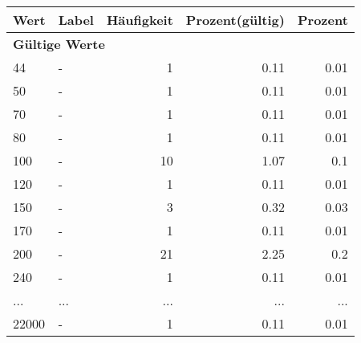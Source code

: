      \begin{longtable}{lXrrr}
     \toprule
     \textbf{Wert} & \textbf{Label} & \textbf{Häufigkeit} & \textbf{Prozent(gültig)} & \textbf{Prozent} \\
     \endhead
     \midrule
     \multicolumn{5}{l}{\textbf{Gültige Werte}}\\
        44 & \multicolumn{1}{X}{-} & %
          \num{1} &
          \num[round-mode=places,round-precision=2]{0.11} &
          \num[round-mode=places,round-precision=2]{0.01} \\
        50 & \multicolumn{1}{X}{-} & %
          \num{1} &
          \num[round-mode=places,round-precision=2]{0.11} &
          \num[round-mode=places,round-precision=2]{0.01} \\
        70 & \multicolumn{1}{X}{-} & %
          \num{1} &
          \num[round-mode=places,round-precision=2]{0.11} &
          \num[round-mode=places,round-precision=2]{0.01} \\
        80 & \multicolumn{1}{X}{-} & %
          \num{1} &
          \num[round-mode=places,round-precision=2]{0.11} &
          \num[round-mode=places,round-precision=2]{0.01} \\
        100 & \multicolumn{1}{X}{-} & %
          \num{10} &
          \num[round-mode=places,round-precision=2]{1.07} &
          \num[round-mode=places,round-precision=2]{0.1} \\
        120 & \multicolumn{1}{X}{-} & %
          \num{1} &
          \num[round-mode=places,round-precision=2]{0.11} &
          \num[round-mode=places,round-precision=2]{0.01} \\
        150 & \multicolumn{1}{X}{-} & %
          \num{3} &
          \num[round-mode=places,round-precision=2]{0.32} &
          \num[round-mode=places,round-precision=2]{0.03} \\
        170 & \multicolumn{1}{X}{-} & %
          \num{1} &
          \num[round-mode=places,round-precision=2]{0.11} &
          \num[round-mode=places,round-precision=2]{0.01} \\
        200 & \multicolumn{1}{X}{-} & %
          \num{21} &
          \num[round-mode=places,round-precision=2]{2.25} &
          \num[round-mode=places,round-precision=2]{0.2} \\
        240 & \multicolumn{1}{X}{-} & %
          \num{1} &
          \num[round-mode=places,round-precision=2]{0.11} &
          \num[round-mode=places,round-precision=2]{0.01} \\
       ... & ... & ... & ... & ... \\
        22000 & \multicolumn{1}{X}{-} & %
          \num{1} &
          \num[round-mode=places,round-precision=2]{0.11} &
          \num[round-mode=places,round-precision=2]{0.01} \\


\end{longtable}
